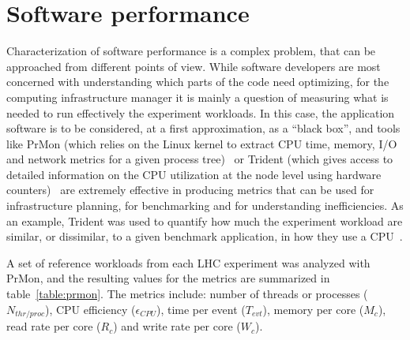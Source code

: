 \section{Software performance}
Characterization of software performance is a complex problem, that
can be approached from different points of view. While software
developers are most concerned with understanding which parts of the
code need optimizing, for the computing infrastructure manager it is
mainly a question of measuring what is needed to run effectively the
experiment workloads. In this case, the application software is to be
considered, at a first approximation, as a ``black box'', and tools
like PrMon (which relies on the Linux kernel to extract CPU time,
memory, I/O and network metrics for a given process tree)~\cite{prmon}
or Trident (which gives access to detailed information on the CPU
utilization at the node level using hardware counters)~\cite{trident}
are extremely effective in producing metrics that can be used for
infrastructure planning, for benchmarking and for understanding
inefficiencies. As an example, Trident was used to quantify how much
the experiment workload are similar, or dissimilar, to a given
benchmark application, in how they use a CPU~\cite{bench}.

A set of reference workloads from each LHC experiment was analyzed
with PrMon, and the resulting values for the metrics are summarized in
table~\ref{table:prmon}. The metrics include: number of threads or
processes ($N_{thr/proc}$), CPU efficiency ($\epsilon_{CPU}$), time
per event ($T_{evt}$), memory per core ($M_c$), read rate per core
($R_c$) and write rate per core ($W_c$).

